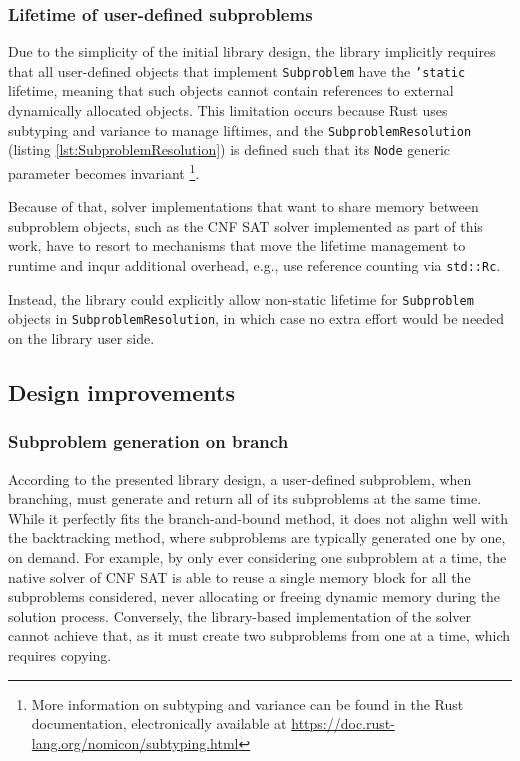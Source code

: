 \subsubsection{Lifetime of user-defined subproblems}

Due to the simplicity of the initial library design, the library implicitly requires
that all user-defined objects that implement \texttt{Subproblem} have the \texttt{'static}
lifetime, meaning that such objects cannot contain references to external
dynamically allocated objects. This limitation occurs because Rust uses subtyping and
variance to manage liftimes, and the \texttt{SubproblemResolution}
(listing \ref{lst:SubproblemResolution}) is defined
such that its \texttt{Node} generic parameter becomes invariant
\footnote{More information on subtyping and variance can be found in the Rust documentation,
electronically available at \url{https://doc.rust-lang.org/nomicon/subtyping.html}}.

Because of that, solver implementations that want to share memory between subproblem objects,
such as the CNF SAT solver implemented as part of this work, have to resort to mechanisms
that move the lifetime management to runtime and inqur additional overhead, e.g.,
use reference counting via \texttt{std::Rc}.

Instead, the library could explicitly allow non-static lifetime for \texttt{Subproblem}
objects in \texttt{SubproblemResolution}, in which case no extra effort would be needed
on the library user side.

\subsection{Design improvements}

\subsubsection{Subproblem generation on branch}

According to the presented library design, a user-defined subproblem, when branching,
must generate and return all of its subproblems at the same time. While it perfectly fits
the branch-and-bound method, it does not alighn well with the backtracking method, where
subproblems are typically generated one by one, on demand. For example, by only ever
considering one subproblem at a time, the native solver of CNF SAT is able to reuse
a single memory block for all the subproblems considered, never allocating or freeing
dynamic memory during the solution process. Conversely, the library-based implementation
of the solver cannot achieve that, as it must create two subproblems from one
at a time, which requires copying.

